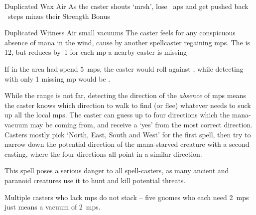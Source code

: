 \ifodd\value{diceNo}

  {Duplicated}%
  {Wax}%
  {Air}%
  {}%
  {As the caster shouts `mrsh',  lose ~\glspl{ap} and get pushed back ~\glspl{step} minus their Strength Bonus}%
  {}

\else

  {Duplicated}%
  {Witness}%
  {Air}%
  {small vacuums}%
  {The caster feels for any conspicuous absence of mana in the wind, cause by another spellcaster regaining \glspl{mp}.
  The  is 12, but reduces by~1 for each \gls{mp} a nearby caster is missing}%
  {If  in the \gls{area} had spend 5~\glspl{mp}, the caster would roll against \tn[7], while detecting  with only 1 missing \gls{mp} would be \tn[11].

  While the range is not far, detecting the direction of the \emph{absence} of \glspl{mp} means the caster knows which direction to walk to find (or flee) whatever needs to suck up all the local \glspl{mp}.
  The caster can guess up to four directions which the mana-vacuum may be coming from, and receive a `yes' from the most correct direction.
  Casters mostly pick `North, East, South and West' for the first spell, then try to narrow down the potential direction of the mana-starved creature with a second casting, where the four directions all point in a similar direction.

  This spell poses a serious danger to all spell-casters, as many ancient and paranoid creatures use it to hunt and kill potential threats.

  Multiple casters who lack \glspl{mp} do not stack -- five gnomes who each need 2~\glspl{mp} just means a vacuum of 2~\glspl{mp}.}

\fi
{}
